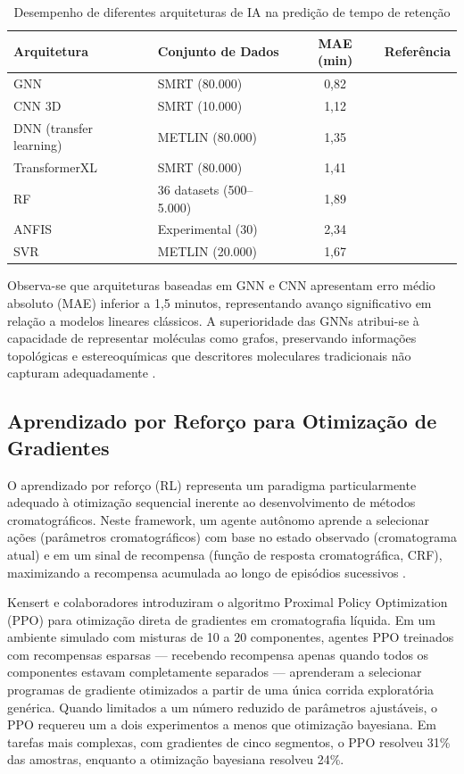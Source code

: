 \documentclass[preprint,12pt]{elsarticle}
\begin{document}
\begin{table}[ht]
\caption{Desempenho de diferentes arquiteturas de IA na predição de tempo de retenção}
\label{tab:desempenho}
\centering
\small
\begin{tabular}{llcc}
\toprule
Arquitetura & Conjunto de Dados & MAE (min) & Referência \\
\midrule
GNN & SMRT (80.000) & 0,82 & \cite{yang2023} \\
CNN 3D & SMRT (10.000) & 1,12 & \cite{randazzo2023} \\
DNN (transfer learning) & METLIN (80.000) & 1,35 & \cite{bouwmeester2020} \\
TransformerXL & SMRT (80.000) & 1,41 & \cite{singh2024} \\
RF & 36 datasets (500--5.000) & 1,89 & \cite{bouwmeester2020} \\
ANFIS & Experimental (30) & 2,34 & \cite{usman2021} \\
SVR & METLIN (20.000) & 1,67 & \cite{bouwmeester2020} \\
\bottomrule
\end{tabular}
\end{table}

Observa-se que arquiteturas baseadas em GNN e CNN apresentam erro médio absoluto (MAE) inferior a 1,5 minutos, representando avanço significativo em relação a modelos lineares clássicos. A superioridade das GNNs atribui-se à capacidade de representar moléculas como grafos, preservando informações topológicas e estereoquímicas que descritores moleculares tradicionais não capturam adequadamente \cite{yang2023, szucs2023}.

\subsection{Aprendizado por Reforço para Otimização de Gradientes}

O aprendizado por reforço (RL) representa um paradigma particularmente adequado à otimização sequencial inerente ao desenvolvimento de métodos cromatográficos. Neste framework, um agente autônomo aprende a selecionar ações (parâmetros cromatográficos) com base no estado observado (cromatograma atual) e em um sinal de recompensa (função de resposta cromatográfica, CRF), maximizando a recompensa acumulada ao longo de episódios sucessivos \cite{niezen2025, kensert2021}.

Kensert e colaboradores \cite{kensert2021} introduziram o algoritmo Proximal Policy Optimization (PPO) para otimização direta de gradientes em cromatografia líquida. Em um ambiente simulado com misturas de 10 a 20 componentes, agentes PPO treinados com recompensas esparsas — recebendo recompensa apenas quando todos os componentes estavam completamente separados — aprenderam a selecionar programas de gradiente otimizados a partir de uma única corrida exploratória genérica. Quando limitados a um número reduzido de parâmetros ajustáveis, o PPO requereu um a dois experimentos a menos que otimização bayesiana. Em tarefas mais complexas, com gradientes de cinco segmentos, o PPO resolveu 31\% das amostras, enquanto a otimização bayesiana resolveu 24\%.
\end{document}
